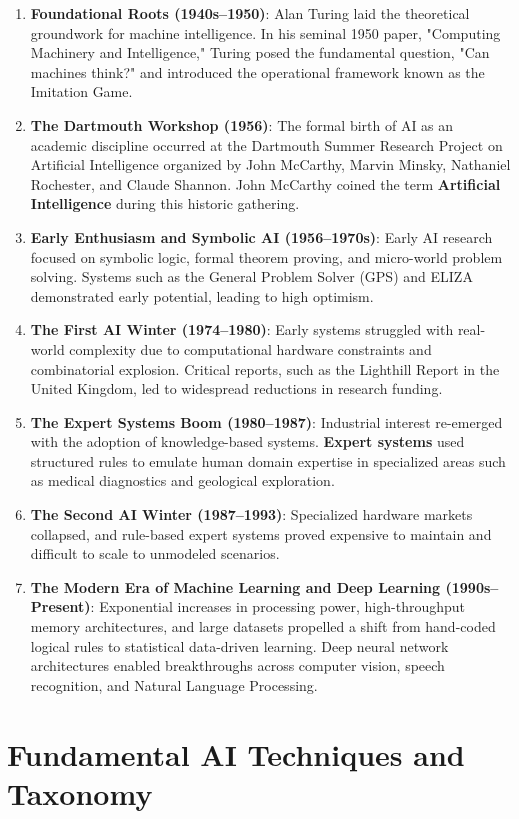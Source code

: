 \documentclass[12pt]{report}
\begin{document}
\begin{enumerate}
    \item \textbf{Foundational Roots (1940s--1950)}: Alan Turing laid the theoretical groundwork for machine intelligence. In his seminal 1950 paper, "Computing Machinery and Intelligence," Turing posed the fundamental question, "Can machines think?" and introduced the operational framework known as the Imitation Game.
    \item \textbf{The Dartmouth Workshop (1956)}: The formal birth of AI as an academic discipline occurred at the Dartmouth Summer Research Project on Artificial Intelligence organized by John McCarthy, Marvin Minsky, Nathaniel Rochester, and Claude Shannon. John McCarthy coined the term \textbf{Artificial Intelligence} during this historic gathering.
    \item \textbf{Early Enthusiasm and Symbolic AI (1956--1970s)}: Early AI research focused on symbolic logic, formal theorem proving, and micro-world problem solving. Systems such as the General Problem Solver (GPS) and ELIZA demonstrated early potential, leading to high optimism.
    \item \textbf{The First AI Winter (1974--1980)}: Early systems struggled with real-world complexity due to computational hardware constraints and combinatorial explosion. Critical reports, such as the Lighthill Report in the United Kingdom, led to widespread reductions in research funding.
    \item \textbf{The Expert Systems Boom (1980--1987)}: Industrial interest re-emerged with the adoption of knowledge-based systems. \textbf{Expert systems} used structured rules to emulate human domain expertise in specialized areas such as medical diagnostics and geological exploration.
    \item \textbf{The Second AI Winter (1987--1993)}: Specialized hardware markets collapsed, and rule-based expert systems proved expensive to maintain and difficult to scale to unmodeled scenarios.
    \item \textbf{The Modern Era of Machine Learning and Deep Learning (1990s--Present)}: Exponential increases in processing power, high-throughput memory architectures, and large datasets propelled a shift from hand-coded logical rules to statistical data-driven learning. Deep neural network architectures enabled breakthroughs across computer vision, speech recognition, and Natural Language Processing.
\end{enumerate}


\section{Fundamental AI Techniques and Taxonomy}
\end{document}
